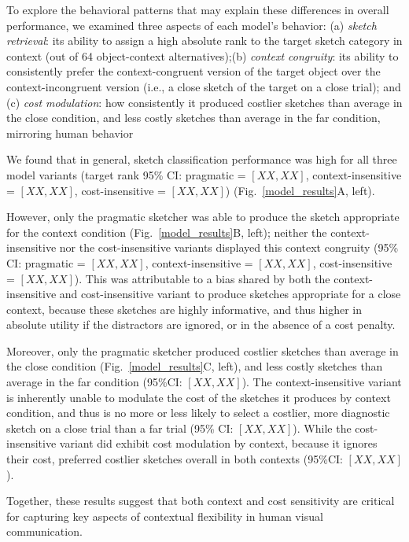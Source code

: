 \documentclass[9pt,twocolumn,twoside]{pnas-new}
\begin{document}
To explore the behavioral patterns that may explain these differences in overall performance, we examined three aspects of each model's behavior: (a) \textit{sketch retrieval}: its ability to assign a high absolute rank to the target sketch category in context (out of 64 object-context alternatives);(b) \textit{context congruity}: its ability to consistently prefer the context-congruent version of the target object over the context-incongruent version (i.e., a close sketch of the target on a close trial); and (c) \textit{cost modulation}: how consistently it produced costlier sketches than average in the close condition, and less costly sketches than average in the far condition, mirroring human behavior

We found that in general, sketch classification performance was high for all three model variants (target rank 95\% CI: pragmatic = $[XX,XX]$, context-insensitive = $[XX,XX]$, cost-insensitive = $[XX,XX]$) (Fig.~\ref{model_results}A, left).

However, only the pragmatic sketcher was able to produce the sketch appropriate for the context condition (Fig.~\ref{model_results}B, left); neither the context-insensitive nor the cost-insensitive variants displayed this context congruity (95\% CI: pragmatic = $[XX,XX]$, context-insensitive = $[XX,XX]$, cost-insensitive = $[XX,XX]$). 
This was attributable to a bias shared by both the context-insensitive and cost-insensitive variant to produce sketches appropriate for a close context, because these sketches are highly informative, and thus higher in absolute utility if the distractors are ignored, or in the absence of a cost penalty. 

Moreover, only the pragmatic sketcher produced costlier sketches than average in the close condition (Fig.~\ref{model_results}C, left), and less costly sketches than average in the far condition (95\%CI: $[XX,XX]$). The context-insensitive variant is inherently unable to modulate the cost of the sketches it produces by context condition, and thus is no more or less likely to select a costlier, more diagnostic sketch on a close trial than a far trial (95\% CI: $[XX,XX]$). 
While the cost-insensitive variant did exhibit cost modulation by context, because it ignores their cost, preferred costlier sketches overall in both contexts (95\%CI: $[XX,XX]$). 

Together, these results suggest that both context and cost sensitivity are critical for capturing key aspects of contextual flexibility in human visual communication. 
\end{document}
